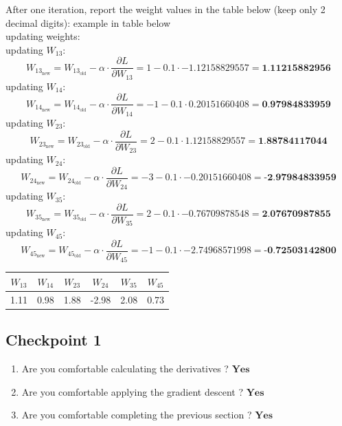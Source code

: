 \documentclass{article}
\begin{document}
\begin{enumerate}
    After one iteration, report the weight values in the table below (keep only 2 decimal digits): example
in table below
\\ updating weights:
\\ updating $W_{13}$:
    \[
    W_{13_{\text{new}}} = W_{13_{\text{old}}} - \alpha \cdot \frac{\partial L}{\partial W_{13}} = 1 - 0.1 \cdot -1.12158829557 = \textbf{1.11215882956}
    \]
updating $W_{14}$:
    \[
    W_{14_{\text{new}}} = W_{14_{\text{old}}} - \alpha \cdot \frac{\partial L}{\partial W_{14}} = -1 - 0.1 \cdot 0.20151660408 = \textbf{0.97984833959}
    \]
updating $W_{23}$:
    \[
    W_{23_{\text{new}}} = W_{23_{\text{old}}} - \alpha \cdot \frac{\partial L}{\partial W_{23}} = 2 - 0.1 \cdot 1.12158829557 = \textbf{1.88784117044}
    \]
updating $W_{24}$:
    \[
    W_{24_{\text{new}}} = W_{24_{\text{old}}} - \alpha \cdot \frac{\partial L}{\partial W_{24}} = -3 - 0.1 \cdot -0.20151660408 = \textbf{-2.97984833959}
    \]
updating $W_{35}$:
    \[
    W_{35_{\text{new}}} = W_{35_{\text{old}}} - \alpha \cdot \frac{\partial L}{\partial W_{35}} = 2 - 0.1 \cdot -0.76709878548 = \textbf{2.07670987855}
    \]
updating $W_{45}$:
    \[
    W_{45_{\text{new}}} = W_{45_{\text{old}}} - \alpha \cdot \frac{\partial L}{\partial W_{45}} = -1 - 0.1 \cdot -2.74968571998 = \textbf{-0.72503142800}
    \]
    \begin{center}
        \begin{tabular}{|c|c|c|c|c|c|}
        \hline
        $W_{13}$ & $W_{14}$ & $W_{23}$ & $W_{24}$ & $W_{35}$ & $W_{45}$ \\ \hline
        1.11   & 0.98    & 1.88    & -2.98    & 2.08   &  0.73  \\ \hline
        \end{tabular}
    \end{center}
\end{enumerate}

\subsection{Checkpoint 1}
\begin{enumerate}
    \item  Are you comfortable calculating the derivatives ? $\textbf{Yes}$
\item Are you comfortable applying the gradient descent ? $\textbf{Yes}$
\item Are you comfortable completing the previous section ? $\textbf{Yes}$
\end{enumerate}
\end{document}
